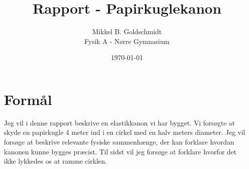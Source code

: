 \documentclass[10pt,a4paper]{article}
\author{Mikkel B. Goldschmidt \\ Fysik A - Nørre Gymnasium}
\title{Rapport - Papirkuglekanon}
\date{\today}
\theoremstyle{break}
\theoremstyle{nonumberplain}
\begin{document}
\maketitle

\section{Formål}
Jeg vil i denne rapport beskrive en elastikkanon vi har bygget. 
Vi forsøgte at skyde en papirkugle 4 meter ind i en cirkel med en halv meters diameter.
Jeg vil forsøge at beskrive relevante fysiske sammenhænge, der kan forklare hvordan kanonen kunne bygges præcist. 
Til sidst vil jeg forsøge at forklare hvorfor det ikke lykkedes os at ramme cirklen.
\end{document}

